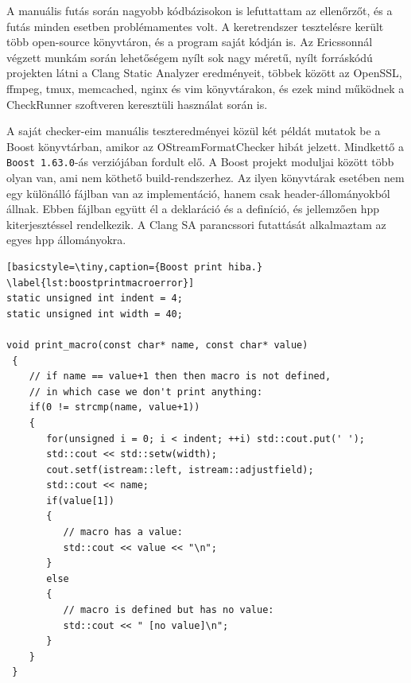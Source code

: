 \documentclass[a4paper,12pt]{report}
\begin{document}
A manuális futás során nagyobb kódbázisokon is lefuttattam az ellenőrzőt, és a futás minden esetben problémamentes volt. A keretrendszer tesztelésre került több open-source könyvtáron, és a program saját kódján is. Az Ericssonnál végzett munkám során lehetőségem nyílt sok nagy méretű, nyílt forráskódú projekten látni a Clang Static Analyzer eredményeit, többek között az OpenSSL, ffmpeg, tmux, memcached, nginx és vim könyvtárakon, és ezek mind működnek a CheckRunner szoftveren keresztüli használat során is.

A saját checker-eim manuális teszteredményei közül két példát mutatok be a Boost \cite{boosthomepage} könyvtárban, amikor az OStreamFormatChecker hibát jelzett. Mindkettő a \texttt{Boost 1.63.0}-ás verziójában fordult elő. A Boost projekt moduljai között több olyan van, ami nem köthető build-rendszerhez. Az ilyen könyvtárak esetében nem egy különálló fájlban van az implementáció, hanem csak header-állományokból állnak. Ebben fájlban együtt él a deklaráció és a definíció, és jellemzően hpp kiterjesztéssel rendelkezik. A Clang SA parancssori futattását alkalmaztam az egyes hpp állományokra.

\begin{lstlisting}[basicstyle=\tiny,caption={Boost print hiba.}
\label{lst:boostprintmacroerror}]
static unsigned int indent = 4;
static unsigned int width = 40;

void print_macro(const char* name, const char* value)
 {
    // if name == value+1 then then macro is not defined,
    // in which case we don't print anything:
    if(0 != strcmp(name, value+1))
    {
       for(unsigned i = 0; i < indent; ++i) std::cout.put(' ');
       std::cout << std::setw(width);
       cout.setf(istream::left, istream::adjustfield);
       std::cout << name;
       if(value[1])
       {
          // macro has a value:
          std::cout << value << "\n";
       }
       else
       {
          // macro is defined but has no value:
          std::cout << " [no value]\n";
       }
    }
 }
\end{lstlisting}
\end{document}
